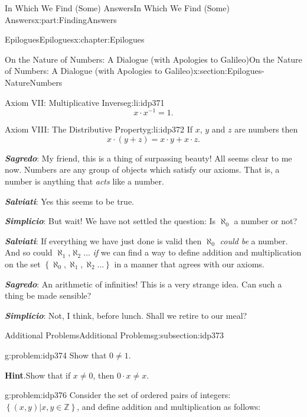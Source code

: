 \documentclass[oneside,10pt,]{book}
\newcommand{\blocktitlefont}{\relax}
\newcommand{\alert}[1]{\textbf{\textit{#1}}}
\numberwithin{equation}{section}
\newcommand{\ZZ}{\mathbb {Z}}
\begin{document}
\begin{partptx}{In Which We Find (Some) Answers}{}{In Which We Find (Some) Answers}{}{}{x:part:FindingAnswers}
\begin{chapterptx}{Epilogues}{}{Epilogues}{}{}{x:chapter:Epilogues}
\begin{sectionptx}{On the Nature of Numbers: A Dialogue (with Apologies to Galileo)}{}{On the Nature of Numbers: A Dialogue (with Apologies to Galileo)}{}{}{x:section:Epilogues-NatureNumbers}
\begin{introduction}{}
\begin{descriptionlist}
\begin{dlimedium}{Axiom VII: Multiplicative Inverse}{g:li:idp371}
\begin{equation*}
x\cdot x^{-1} =1\text{.}
\end{equation*}
%
\end{dlimedium}%
\begin{dlimedium}{Axiom VIII: The Distributive Property}{g:li:idp372}%
If \(x\), \(y\) and \(z\) are numbers then%
\begin{equation*}
x\cdot(y+z) = x\cdot y+x\cdot z\text{.}
\end{equation*}
%
\end{dlimedium}%
\end{descriptionlist}
%
\par
\alert{Sagredo}: My friend, this is a thing of surpassing beauty! All seems clear to me now. Numbers are any group of objects which satisfy our axioms. That is, a number is anything that \emph{acts} like a number.%
\par
\alert{Salviati}:  Yes this seems to be true.%
\par
\alert{Simplicio}:  But wait! We have not settled the question: Is \(\aleph_0\) a number or not?%
\par
\alert{Salviati}:  If everything we have just done is valid then \(\aleph_0\) \emph{could be} a number. And so could \(\aleph_1\),\(\aleph_2 \ldots\) \emph{if} we can find a way to define addition and multiplication on the set \(\left\{\aleph_0, \aleph_1, \aleph_2 \ldots\right\}\) in a manner that agrees with our axioms.%
\par
\alert{Sagredo}:  An arithmetic of infinities! This is a very strange idea. Can such a thing be made sensible?%
\par
\alert{Simplicio}:  Not, I think, before lunch. Shall we retire to our meal?%
\end{introduction}%
%
%
\typeout{************************************************}
\typeout{************************************************}
%
\begin{subsectionptx}{Additional Problems}{}{Additional Problems}{}{}{g:subsection:idp373}
\begin{problem}{}{g:problem:idp374}%
Show that \(0\neq 1\).%
\par\smallskip%
\noindent\textbf{\blocktitlefont Hint}.\hypertarget{g:hint:idp375}{}\quad{}Show that if \(x\neq0\), then \(0\cdot x \neq x\).%
\end{problem}
\begin{problem}{}{g:problem:idp376}%
Consider the set of ordered pairs of integers: \(\left\{(x,y)|x, y \in \ZZ\right\}\), and define addition and multiplication as follows:%

\end{problem}
\end{subsectionptx}
\end{sectionptx}
\end{chapterptx}
\end{partptx}
\end{document}
